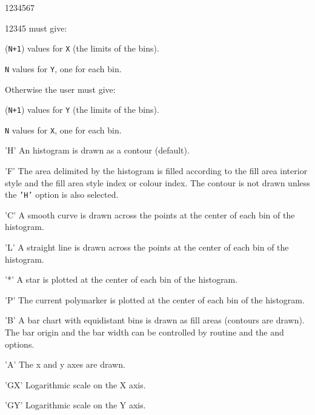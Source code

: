 \begin{DLtt}{1234567}
\begin{DLtt}{12345}
               must give:
   \begin{UL}
      \item ({\tt N+1}) values for {\tt X} (the limits of the bins).
      \item {\tt N} values for {\tt Y}, one for each bin.
   \end{UL}
   Otherwise the user must give:
   \begin{UL}
      \item ({\tt N+1}) values for {\tt Y} (the limits of the bins).
      \item {\tt N} values for {\tt X}, one for each bin.
   \end{UL}
   \item['H'] An histogram is drawn as a contour (default).
   \item['F'] The area delimited by the histogram is filled according to the
              fill area interior style and the fill area style index or colour
              index. The contour is not drawn unless the {\tt 'H'} option is
              also selected.
   \item['C'] A smooth curve is drawn across the points at the center of each
              bin of the histogram.
   \item['L'] A straight line is drawn across the points at the center of
              each bin of the histogram.
   \item['*'] A star is plotted at the center of each bin of the histogram.
   \item['P'] The current polymarker is plotted at the center of each bin
              of the histogram.
   \item['B'] A bar chart with equidistant bins is drawn as fill areas
              (contours are drawn). The bar origin and the bar
              width can be controlled by routine  and the
               and  options.
   \item['A'] The x and y axes are drawn.
   \item['GX'] Logarithmic scale on the X axis.
   \item['GY'] Logarithmic scale on the Y axis.
\end{DLtt}
\end{DLtt}

\newpage

